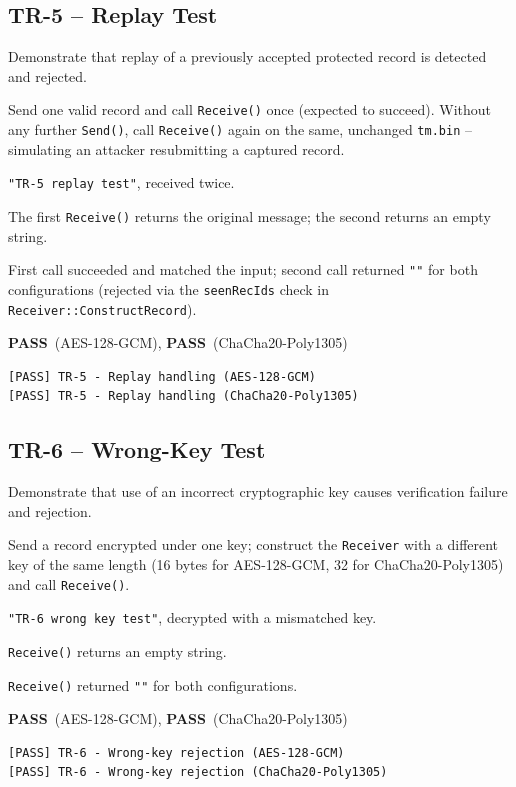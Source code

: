 \documentclass[11pt]{article}
\newcommand{\PASS}{\textcolor{passgreen}{\textbf{PASS}}}
\begin{document}
\subsection{TR-5 -- Replay Test}

\begin{description}[leftmargin=2.2cm,style=nextline]
\item[Objective] Demonstrate that replay of a previously accepted protected record is
detected and rejected.
\item[Procedure] Send one valid record and call \texttt{Receive()} once (expected to
succeed). Without any further \texttt{Send()}, call \texttt{Receive()} again on the
same, unchanged \texttt{tm.bin} -- simulating an attacker resubmitting a captured
record.
\item[Test Input] \texttt{"TR-5 replay test"}, received twice.
\item[Expected Behaviour] The first \texttt{Receive()} returns the original message;
the second returns an empty string.
\item[Observed Behaviour] First call succeeded and matched the input; second call
returned \texttt{""} for both configurations (rejected via the \texttt{seenRecIds}
check in \texttt{Receiver::ConstructRecord}).
\item[Outcome] \PASS\ (AES-128-GCM), \PASS\ (ChaCha20-Poly1305)
\end{description}
\begin{lstlisting}[style=console]
[PASS] TR-5 - Replay handling (AES-128-GCM)
[PASS] TR-5 - Replay handling (ChaCha20-Poly1305)
\end{lstlisting}

\subsection{TR-6 -- Wrong-Key Test}

\begin{description}[leftmargin=2.2cm,style=nextline]
\item[Objective] Demonstrate that use of an incorrect cryptographic key causes
verification failure and rejection.
\item[Procedure] Send a record encrypted under one key; construct the
\texttt{Receiver} with a different key of the same length (16 bytes for AES-128-GCM,
32 for ChaCha20-Poly1305) and call \texttt{Receive()}.
\item[Test Input] \texttt{"TR-6 wrong key test"}, decrypted with a mismatched key.
\item[Expected Behaviour] \texttt{Receive()} returns an empty string.
\item[Observed Behaviour] \texttt{Receive()} returned \texttt{""} for both
configurations.
\item[Outcome] \PASS\ (AES-128-GCM), \PASS\ (ChaCha20-Poly1305)
\end{description}
\begin{lstlisting}[style=console]
[PASS] TR-6 - Wrong-key rejection (AES-128-GCM)
[PASS] TR-6 - Wrong-key rejection (ChaCha20-Poly1305)
\end{lstlisting}
\end{document}
